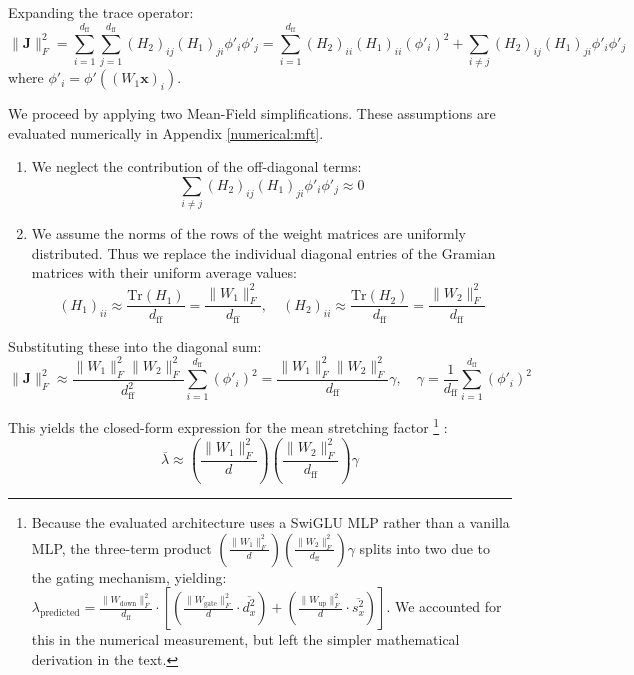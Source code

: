 \documentclass[a4paper,12pt]{article}
\begin{document}
    Expanding the trace operator:
    $$\|\mathbf{J}\|_F^2 = \sum_{i=1}^{d_{\text{ff}}} \sum_{j=1}^{d_{\text{ff}}} (H_2)_{ij} (H_1)_{ji} \phi'_i \phi'_j = \sum_{i=1}^{d_{\text{ff}}} (H_2)_{ii} (H_1)_{ii} (\phi'_i)^2 + \sum_{i \neq j} (H_2)_{ij} (H_1)_{ji} \phi'_i \phi'_j$$
    where $\phi'_i = \phi'( (W_1 \mathbf{x})_i )$.

    We proceed by applying two Mean-Field simplifications. These assumptions are evaluated numerically in Appendix \ref{numerical:mft}.

    \begin{enumerate}
        \item We neglect the contribution of the off-diagonal terms:
        $$\sum_{i \neq j} (H_2)_{ij} (H_1)_{ji} \phi'_i \phi'_j \approx 0$$
        
        \item We assume the norms of the rows of the weight matrices are uniformly distributed. Thus we replace the individual diagonal entries of the Gramian matrices with their uniform average values:
        $$(H_1)_{ii} \approx \frac{\text{Tr}(H_1)}{d_{\text{ff}}} = \frac{\|W_1\|_F^2}{d_{\text{ff}}}, \quad (H_2)_{ii} \approx \frac{\text{Tr}(H_2)}{d_{\text{ff}}} = \frac{\|W_2\|_F^2}{d_{\text{ff}}}$$
    \end{enumerate}
        
    Substituting these into the diagonal sum:
    $$\|\mathbf{J}\|_F^2 \approx \frac{\|W_1\|_F^2 \|W_2\|_F^2}{d_{\text{ff}}^2} \sum_{i=1}^{d_{\text{ff}}} (\phi'_i)^2 = \frac{\|W_1\|_F^2 \|W_2\|_F^2}{d_{\text{ff}}} \gamma, \quad \gamma = \frac{1}{d_{\text{ff}}} \sum_{i=1}^{d_{\text{ff}}} (\phi'_i)^2$$

    This yields the closed-form expression for the mean stretching factor
    \footnote{Because the evaluated architecture uses a SwiGLU MLP rather than a vanilla MLP, the three-term product $\left( \frac{\|W_1\|_F^2}{d} \right) \left( \frac{\|W_2\|_F^2}{d_{\text{ff}}} \right) \gamma$ splits into two due to the gating mechanism, yielding: $\lambda_{\text{predicted}} = \frac{\|W_{\text{down}}\|_F^2}{d_{\text{ff}}} \cdot \left[ \left(\frac{\|W_{\text{gate}}\|_F^2}{d} \cdot \overline{d_x^2}\right) + \left(\frac{\|W_{\text{up}}\|_F^2}{d} \cdot \overline{s_x^2}\right) \right]$. We accounted for this in the numerical measurement, but left the simpler mathematical derivation in the text.}
    :
    $$\overline{\lambda} \approx \left( \frac{\|W_1\|_F^2}{d} \right) \left( \frac{\|W_2\|_F^2}{d_{\text{ff}}} \right) \gamma$$
\end{document}
